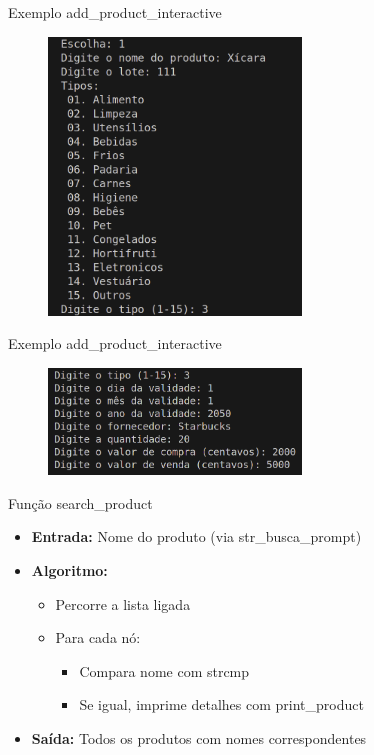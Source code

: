 \documentclass{beamer}
\begin{document}
\begin{frame}{Exemplo add\_product\_interactive}
    \begin{figure}
        \centering
        \includegraphics[width=0.6\textwidth]{img/add-1.png}
    \end{figure}
\end{frame}

\begin{frame}{Exemplo add\_product\_interactive}
    \begin{figure}
        \centering
        \includegraphics[width=0.6\textwidth]{img/add-2.png}
    \end{figure}
\end{frame}

\begin{frame}{Função search\_product}
    \begin{itemize}
        \item \textbf{Entrada:} Nome do produto (via str\_busca\_prompt)
        \item \textbf{Algoritmo:}
        \begin{itemize}
            \item Percorre a lista ligada
            \item Para cada nó:
            \begin{itemize}
                \item Compara nome com strcmp
                \item Se igual, imprime detalhes com print\_product
            \end{itemize}
        \end{itemize}
        \item \textbf{Saída:} Todos os produtos com nomes correspondentes
    \end{itemize}
\end{frame}
\end{document}
